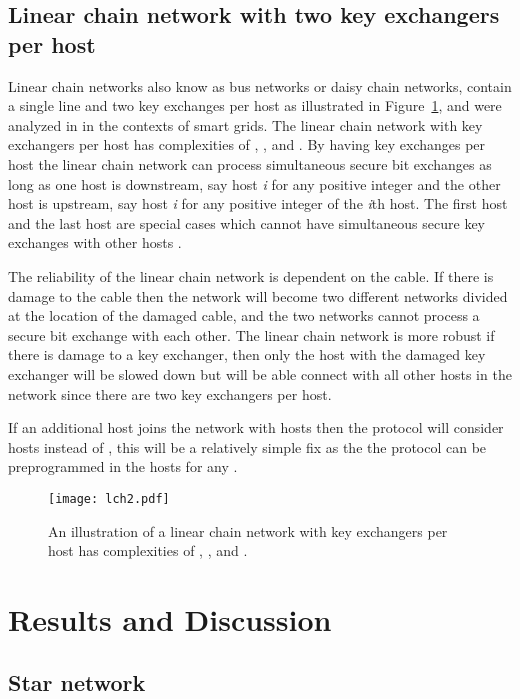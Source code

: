 \documentclass[a4paper,12pt,pdftex]{article}
\begin{document}
\subsection{Linear chain network with two key exchangers per host}

Linear chain networks also know as bus networks or daisy chain networks, contain a single line and two key exchanges per host as illustrated in Figure~\ref{fig:lch}, and were analyzed in \cite{me1} in the contexts of smart grids. The linear chain network with  key exchangers per host has complexities of , , and . By having  key exchanges per host the linear chain network can process  simultaneous secure bit exchanges as long as one host is downstream, say host \textit{i} for any positive integer  and the other host is upstream, say host \textit{i} for any positive integer  of the \textit{i}th host. The first host and the last host are special cases which cannot have simultaneous secure key exchanges with other hosts \cite{me1}. 

The reliability of the linear chain network is dependent on the cable. If there is damage to the cable then the network will become two different networks divided at the location of the damaged cable, and the two networks cannot process a secure bit exchange with each other. The linear chain network is more robust if there is damage to a key exchanger, then only the host with the damaged key exchanger will be slowed down but will be able connect with all other hosts in the network since there are two key exchangers per host. 

If an additional host joins the network with  hosts then the protocol will consider  hosts instead of , this will be a relatively simple fix as the the protocol can be preprogrammed in the hosts for any .

\begin{figure}[h]
    \caption{An illustration of a linear chain network with  key exchangers per host has complexities of , , and . }
    \label{fig:lch}
  \centering
\texttt{[image: lch2.pdf]}
\end{figure}


\section{Results and Discussion}


\subsection{Star network}
\end{document}
